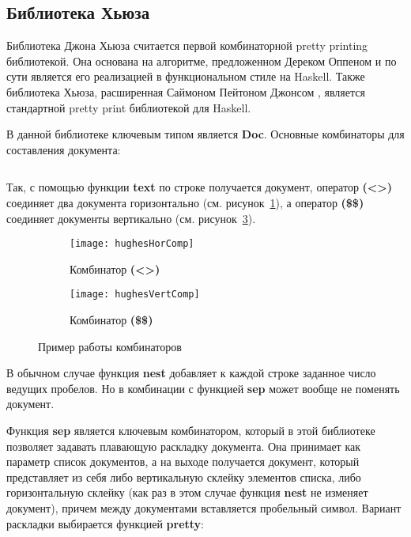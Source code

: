 \subsection{Библиотека Хьюза}

Библиотека Джона Хьюза\cite{hughes} считается первой комбинаторной pretty printing библиотекой. Она основана на алгоритме, предложенном Дереком Оппеном \cite{oppen} и по сути является его реализацией в функциональном стиле на Haskell. Также библиотека Хьюза, расширенная Саймоном Пейтоном Джонсом \cite{peytonJones}, является стандартной pretty print библиотекой для Haskell.


В данной библиотеке ключевым типом является \textbf{Doc}. Основные комбинаторы для составления документа:
\inputminted{haskell}{codes/hughesBasicOperators.hs}

Так, с помощью функции \textbf{text} по строке получается документ, оператор \textbf{(<>)} соединяет два документа горизонтально (см. рисунок~\ref{fig:hughesHorComp}), а оператор \textbf{(\$\$)} соединяет документы вертикально (см. рисунок~\ref{fig:hughesVertComp}).

\begin{figure}[h!]
	\begin{subfigure}[b]{0.45\linewidth}
		\centering
		\texttt{[image: hughesHorComp]}
		\caption{Комбинатор \textbf{(<>)}}
		\label{fig:hughesHorComp}
	\end{subfigure}
	\hspace{0.5cm}
	\begin{subfigure}[b]{0.45\linewidth}
		\centering
		\texttt{[image: hughesVertComp]}
		\caption{Комбинатор \textbf{(\$\$)}}
		\label{fig:hughesVertComp}
	\end{subfigure}
	\caption{Пример работы комбинаторов}
\end{figure}

В обычном случае функция \textbf{nest} добавляет к каждой строке заданное число ведущих пробелов. Но в комбинации с функцией \textbf{sep} может вообще не поменять документ.

Функция \textbf{sep} является ключевым комбинатором, который в этой библиотеке позволяет задавать плавающую раскладку документа. Она принимает как параметр список документов, а на выходе получается документ, который представляет из себя либо вертикальную склейку элементов списка, либо горизонтальную склейку (как раз в этом случае функция \textbf{nest} не изменяет документ), причем между документами вставляется пробельный символ. Вариант раскладки выбирается функцией \textbf{pretty}:

